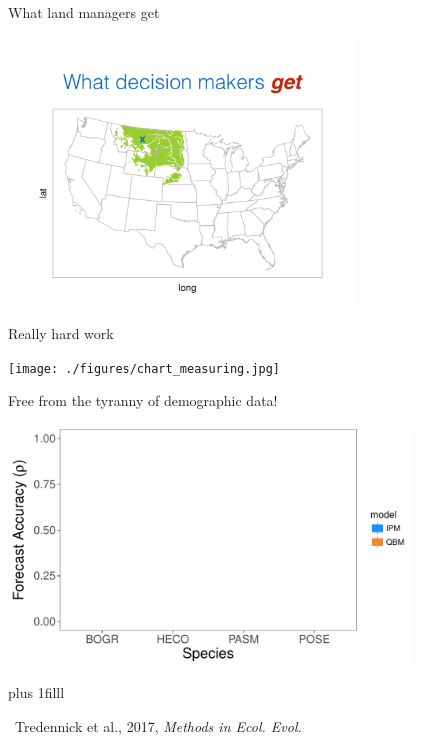 \documentclass[14pt, compress, aspectratio=1610]{beamer}
\newcommand{\btVFill}{\vskip0pt plus 1filll}
\newcommand{\credit}[1]{\btVFill\par\hfill \footnotesize ~#1}
\let\OldTexttt\texttt
\renewcommand{\texttt}[1]{\OldTexttt{\color{plTT}#1}}
\begin{document}
\begin{frame}{%
\protect\hypertarget{what-land-managers-get}{%
What land managers get}}

\centering

\includegraphics[height=2.8in]{./figures/managers_get.pdf}

\end{frame}

\begin{frame}{%
\protect\hypertarget{really-hard-work}{%
Really hard work}}

\texttt{[image: ./figures/chart\_measuring.jpg]}

\end{frame}

\begin{frame}{%
\protect\hypertarget{free-from-the-tyranny-of-demographic-data}{%
Free from the tyranny of demographic data!}}

\centering

\includegraphics[height=2.5in]{./figures/mee_forecast_accuracy_empty.pdf}

\credit{Tredennick et al., 2017, \emph{Methods in Ecol. Evol.}}

\end{frame}
\end{document}
